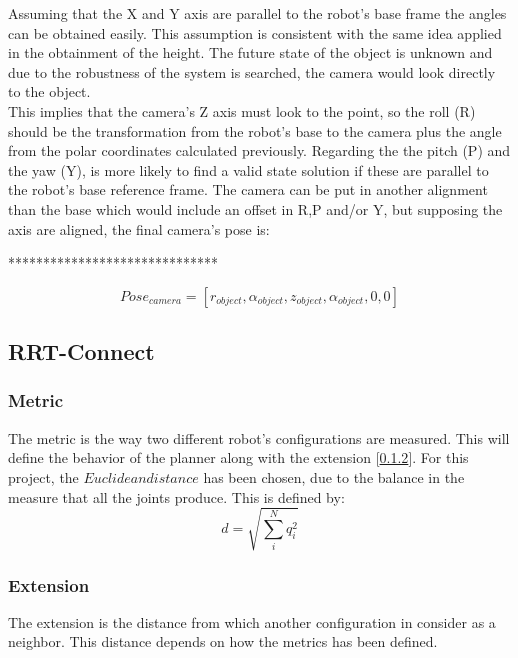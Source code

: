 	Assuming that the X and Y axis are parallel to the robot's base frame the angles can be obtained easily.
	This assumption is consistent with the same idea applied in the obtainment of the height. 
	The future state of the object is unknown and due to the robustness of the system is searched, the camera would look directly to the object.\\

	This implies that the camera's Z axis must look to the point, so the roll (R) should be the transformation from the robot's base to the camera plus the angle from the polar coordinates calculated previously.
	Regarding the the pitch (P) and the yaw (Y), is more likely to find a valid state solution if these are parallel to the robot's base reference frame. 
	The camera can be put in another alignment than the base which would include an offset in R,P and/or Y, but supposing the axis are aligned, the final camera's pose is:

	******************************

		\begin{equation}
			\label{eq:cameras_pose}
			Pose_{camera} = [r_{object},\alpha_{object},z_{object},\alpha_{object},0,0]
		\end{equation}

	\subsection{RRT-Connect} %
	\label{sub:rrt_connect_implementation}
	\subsubsection{Metric} %
	\label{sub:metric}
	The metric is the way two different robot's configurations are measured. This will define the behavior of the planner along with the extension [\ref{sub:extension}]. For this project, the $Euclidean distance$ has been chosen, due to the balance in the measure that all the joints produce. This is defined by:
	\begin{equation}
		d=\sqrt{\sum_i^N q_i^2}
	\end{equation}

	\subsubsection{Extension} %
	\label{sub:extension}
	The extension is the distance from which another configuration in consider as a neighbor. This distance depends on how the metrics has been defined.

